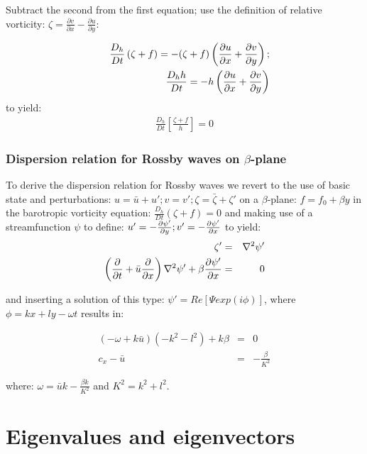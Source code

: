 Subtract the second from the first equation; use the definition of relative vorticity: $\zeta = \frac{\partial v}{\partial x} - \frac{\partial u}{\partial y}$:

\begin{eqnarray}
	&&\frac{D_h}{Dt}\left({\zeta+f}\right) = -(\zeta+f) \left( \frac{\partial u}{\partial x} + \frac{\partial v}{\partial y} \right);\\
	&&\frac{D_h h}{D t} = -h \left( \frac{\partial u}{\partial x} + \frac{\partial v}{\partial y} \right)
\end{eqnarray}
to yield:
\begin{eqnarray}
	\frac{D_h}{Dt}\left[\frac {\zeta+f}{h} \right]=0
	\label{PVcons}
\end{eqnarray} 

\subsection{Dispersion relation for Rossby waves on $\beta$-plane}

To derive the dispersion relation for Rossby waves we revert to the use of basic state and perturbations: $u=\bar{u}+u'; v=v'; \zeta = \bar{\zeta}+\zeta'$ on a $\beta$-plane: $f=f_0+\beta y$ in the barotropic vorticity equation: $\frac{D_h}{Dt}\left({\zeta+f} \right)=0$
and making use of a streamfunction $\psi$ to define: $u'=-\frac{\partial \psi'}{\partial y}; v'=-\frac{\partial \psi'}{\partial x}$ to yield:
\begin{eqnarray}
	\zeta'&=&\nabla^2\psi'\\
	\left(\frac{\partial }{\partial t}+\bar{u}\frac{\partial }{\partial x}\right)\nabla^2\psi'+\beta \frac{\partial \psi'}{\partial x}&=&0
\end{eqnarray}

and inserting a solution of this type: $\psi'=Re[\Psi exp(i\phi)]$, where $\phi=kx+ly-\omega t$ results in:

\begin{eqnarray}
	(-\omega + k\bar{u})(-k^2-l^2)+k \beta & = & 0\\
	c_x-\bar{u} & = & -\frac{\beta}{K^2}
\end{eqnarray}

where: $\omega=\bar{u}k-\frac{\beta k}{K^2}$ and $K^2=k^2+l^2$.\\


\vspace{1em} 

\newpage
\chapter{Eigenvalues and eigenvectors}

